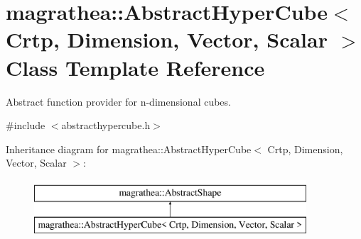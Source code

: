 \hypertarget{classmagrathea_1_1AbstractHyperCube}{\section{magrathea\-:\-:Abstract\-Hyper\-Cube$<$ Crtp, Dimension, Vector, Scalar $>$ Class Template Reference}
\label{classmagrathea_1_1AbstractHyperCube}
}


Abstract function provider for n-\/dimensional cubes.  




{\ttfamily \#include $<$abstracthypercube.\-h$>$}

Inheritance diagram for magrathea\-:\-:Abstract\-Hyper\-Cube$<$ Crtp, Dimension, Vector, Scalar $>$\-:\begin{figure}[H]
\begin{center}
\leavevmode
\includegraphics[height=2.000000cm]{classmagrathea_1_1AbstractHyperCube}
\end{center}
\end{figure}
